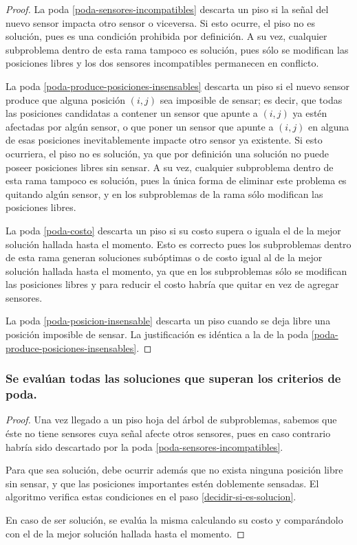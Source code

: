 \documentclass[a4paper, 10pt, twoside]{article}
\begin{document}
\begin{proof}
    La poda \ref{poda-sensores-incompatibles} descarta un piso si la señal del nuevo sensor impacta otro sensor o viceversa. Si esto ocurre, el piso no es solución, pues es una condición prohibida por definición. A su vez, cualquier subproblema dentro de esta rama tampoco es solución, pues sólo se modifican las posiciones libres y los dos sensores incompatibles permanecen en conflicto.

    La poda \ref{poda-produce-posiciones-insensables} descarta un piso si el nuevo sensor produce que alguna posición $(i, j)$ sea imposible de sensar; es decir, que todas las posiciones candidatas a contener un sensor que apunte a $(i, j)$ ya estén afectadas por algún sensor, o que poner un sensor que apunte a $(i, j)$ en alguna de esas posiciones inevitablemente impacte otro sensor ya existente. Si esto ocurriera, el piso no es solución, ya que por definición una solución no puede poseer posiciones libres sin sensar. A su vez, cualquier subproblema dentro de esta rama tampoco es solución, pues la única forma de eliminar este problema es quitando algún sensor, y en los subproblemas de la rama sólo modifican las posiciones libres.

    La poda \ref{poda-costo} descarta un piso si su costo supera o iguala el de la mejor solución hallada hasta el momento. Esto es correcto pues los subproblemas dentro de esta rama generan soluciones subóptimas o de costo igual al de la mejor solución hallada hasta el momento, ya que en los subproblemas sólo se modifican las posiciones libres y para reducir el costo habría que quitar en vez de agregar sensores.

    La poda \ref{poda-posicion-insensable} descarta un piso cuando se deja libre una posición imposible de sensar. La justificación es idéntica a la de la poda \ref{poda-produce-posiciones-insensables}.
\end{proof}


\subsubsection{Se evalúan todas las soluciones que superan los criterios de poda.}

\begin{proof}
    Una vez llegado a un piso hoja del árbol de subproblemas, sabemos que éste no tiene sensores cuya señal afecte otros sensores, pues en caso contrario habría sido descartado por la poda \ref{poda-sensores-incompatibles}.

    Para que sea solución, debe ocurrir además que no exista ninguna posición libre sin sensar, y que las posiciones importantes estén doblemente sensadas. El algoritmo verifica estas condiciones en el paso \ref{decidir-si-es-solucion}.

    En caso de ser solución, se evalúa la misma calculando su costo y comparándolo con el de la mejor solución hallada hasta el momento.
\end{proof}
\end{document}
